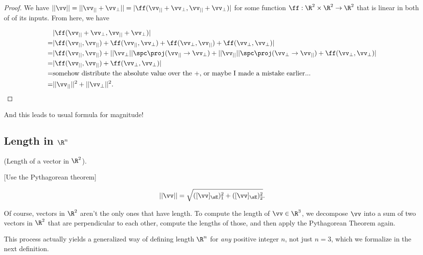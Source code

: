 \begin{proof}
	We have $||\vv|| = ||\vv_{||} + \vv_{\perp}|| = |\ff(\vv_{||} + \vv_{\perp}, \vv_{||} + \vv_{\perp})|$ for some function $\ff:\R^2 \times \R^2 \rightarrow \R^2$ that is linear in both of of its inputs. From here, we have
	
	\begin{align*}
		&|\ff(\vv_{||} + \vv_{\perp}, \vv_{||} + \vv_{\perp})| \\
		= &|\ff(\vv_{||}, \vv_{||}) + \ff(\vv_{||}, \vv_{\perp}) + \ff(\vv_{\perp}, \vv_{||}) + \ff(\vv_{\perp}, \vv_{\perp})| \\
		= &|\ff(\vv_{||}, \vv_{||}) + ||\vv_{\perp}|| \spc \proj(\vv_{||} \rightarrow \vv_{\perp}) + ||\vv_{||}|| \spc \proj(\vv_{\perp} \rightarrow \vv_{||}) + \ff(\vv_{\perp}, \vv_{\perp})| \\
		= &|\ff(\vv_{||}, \vv_{||}) + \ff(\vv_{\perp}, \vv_{\perp})| \\
		= &\text{somehow distribute the absolute value over the $+$, or maybe I made a mistake earlier...} \\
		= &||\vv_{||}||^2 + ||\vv_{\perp}||^2.
	\end{align*}
\end{proof}

And this leads to usual formula for magnitude!

\subsection*{Length in $\R^n$}

\begin{theorem}
	\label{ch::lin_alg::thm::length_in_R2}
	(Length of a vector in $\R^2$).
	
	[Use the Pythagorean theorem]
	
	\begin{align*}
		||\vv|| = \sqrt{([\vv]_\sE)_1^2 + ([\vv]_\sE)_2^2}.
	\end{align*}
\end{theorem}

Of course, vectors in $\R^2$ aren't the only ones that have length. To compute the length of $\vv \in \R^3$, we decompose $\vv$ into a sum of two vectors in $\R^2$ that are perpendicular to each other, compute the lengths of those, and then apply the Pythagorean Theorem again.

This process actually yields a generalized way of defining length $\R^n$ for \textit{any} positive integer $n$, not just $n = 3$, which we formalize in the next definition.

